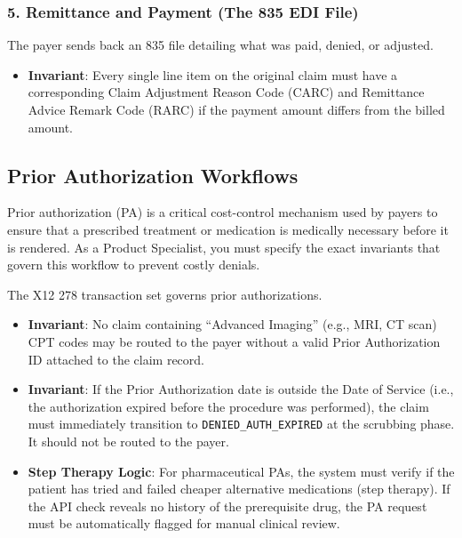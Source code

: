 \documentclass[
  11pt,
  openany,
  oneside]{book}
\providecommand{\tightlist}{%
  \setlength{\itemsep}{0pt}\setlength{\parskip}{0pt}}
\begin{document}
\subsubsection{5. Remittance and Payment (The 835 EDI
File)}\label{remittance-and-payment-the-835-edi-file}

The payer sends back an 835 file detailing what was paid, denied, or
adjusted.

\begin{itemize}
\tightlist
\item
  \textbf{Invariant}: Every single line item on the original claim must
  have a corresponding Claim Adjustment Reason Code (CARC) and
  Remittance Advice Remark Code (RARC) if the payment amount differs
  from the billed amount.
\end{itemize}

\subsection{Prior Authorization
Workflows}\label{prior-authorization-workflows}

Prior authorization (PA) is a critical cost-control mechanism used by
payers to ensure that a prescribed treatment or medication is medically
necessary before it is rendered. As a Product Specialist, you must
specify the exact invariants that govern this workflow to prevent costly
denials.

The X12 278 transaction set governs prior authorizations.

\begin{itemize}
\tightlist
\item
  \textbf{Invariant}: No claim containing ``Advanced Imaging'' (e.g.,
  MRI, CT scan) CPT codes may be routed to the payer without a valid
  Prior Authorization ID attached to the claim record.
\item
  \textbf{Invariant}: If the Prior Authorization date is outside the
  Date of Service (i.e., the authorization expired before the procedure
  was performed), the claim must immediately transition to
  \texttt{DENIED\_AUTH\_EXPIRED} at the scrubbing phase. It should not
  be routed to the payer.
\item
  \textbf{Step Therapy Logic}: For pharmaceutical PAs, the system must
  verify if the patient has tried and failed cheaper alternative
  medications (step therapy). If the API check reveals no history of the
  prerequisite drug, the PA request must be automatically flagged for
  manual clinical review.
\end{itemize}
\end{document}
